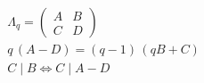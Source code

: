 \documentclass{article}
\begin{document}
\[
\begin{aligned}
&\Lambda_q=\begin{pmatrix}A&B\\ C&D\end{pmatrix}\\
&q\,(A-D)=(q-1)\,(qB+C)\\
&C\mid B\iff C\mid A-D
\end{aligned}
\]
\end{document}
